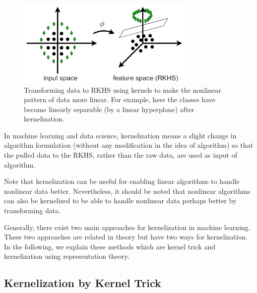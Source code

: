 \documentclass[lang=cn,10pt]{gorgeousnbook}
\numberwithin{equation}{section}%
\numberwithin{figure}{section}%
\begin{document}
\begin{figure}[!t]
\centering
\includegraphics[width=3.4in]{./images/separating_classes}
\caption{Transforming data to RKHS using kernels to make the nonlinear pattern of data more linear. For example, here the classes have become linearly separable (by a linear hyperplane) after kernelization.}
\label{figure_separating_classes_kernel}
\end{figure}

\begin{definition}[Kernelization]
In machine learning and data science, kernelization means a slight change in algorithm formulation (without any modification in the idea of algorithm) so that the pulled data to the RKHS, rather than the raw data, are used as input of algorithm. 
\end{definition}
Note that kernelization can be useful for enabling linear algorithms to handle nonlinear data better. Nevertheless, it should be noted that nonlinear algorithms can also be kernelized to be able to handle nonlinear data perhaps better by transforming data. 

Generally, there exist two main approaches for kernelization in machine learning. These two approaches are related in theory but have two ways for kernelization. 
In the following, we explain these methods which are kernel trick and kernelization using representation theory. 

\subsection{Kernelization by Kernel Trick}\label{section_kernel_trick}
\end{document}
